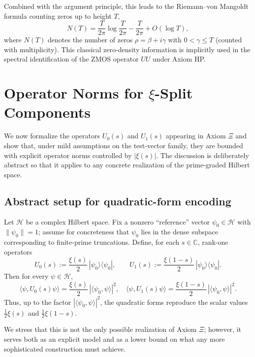 \documentclass[11pt]{article}
\begin{document}
Combined with the argument principle, this leads to the Riemann--von Mangoldt formula counting zeros up to height $T$,
\begin{equation}
  N(T) = \frac{T}{2\pi}\log\frac{T}{2\pi} - \frac{T}{2\pi} + O(\log T),
\end{equation}
where $N(T)$ denotes the number of zeros $\rho=\beta+i\gamma$ with $0<\gamma\le T$ (counted with multiplicity).  This classical zero-density information is implicitly used in the spectral identification of the ZMOS operator $UU$ under Axiom HP.

\section{Operator Norms for $\xi$-Split Components}

We now formalize the operators $U_0(s)$ and $U_1(s)$ appearing in Axiom $\Xi$ and show that, under mild assumptions on the test-vector family, they are bounded with explicit operator norms controlled by $|\xi(s)|$.  The discussion is deliberately abstract so that it applies to any concrete realization of the prime-graded Hilbert space.

\subsection{Abstract setup for quadratic-form encoding}

Let $\mathcal{H}$ be a complex Hilbert space.  Fix a nonzero ``reference'' vector $\psi_0\in\mathcal{H}$ with $\|\psi_0\|=1$; assume for concreteness that $\psi_0$ lies in the dense subspace corresponding to finite-prime truncations.  Define, for each $s\in\mathbb{C}$, rank-one operators
\begin{equation}
  U_0(s) := \frac{\xi(s)}{2}\, |\psi_0\rangle\langle \psi_0|, \qquad
  U_1(s) := \frac{\xi(1-s)}{2}\, |\psi_0\rangle\langle \psi_0|.
\end{equation}
Then for every $\psi\in\mathcal{H}$,
\begin{equation}
  \langle \psi, U_0(s)\psi\rangle
  = \frac{\xi(s)}{2}\,|\langle\psi_0,\psi\rangle|^2, \quad
  \langle \psi, U_1(s)\psi\rangle
  = \frac{\xi(1-s)}{2}\,|\langle\psi_0,\psi\rangle|^2.
\end{equation}
Thus, up to the factor $|\langle\psi_0,\psi\rangle|^2$, the quadratic forms reproduce the scalar values $\tfrac12\xi(s)$ and $\tfrac12\xi(1-s)$.

We stress that this is not the only possible realization of Axiom $\Xi$; however, it serves both as an explicit model and as a lower bound on what any more sophisticated construction must achieve.
\end{document}
